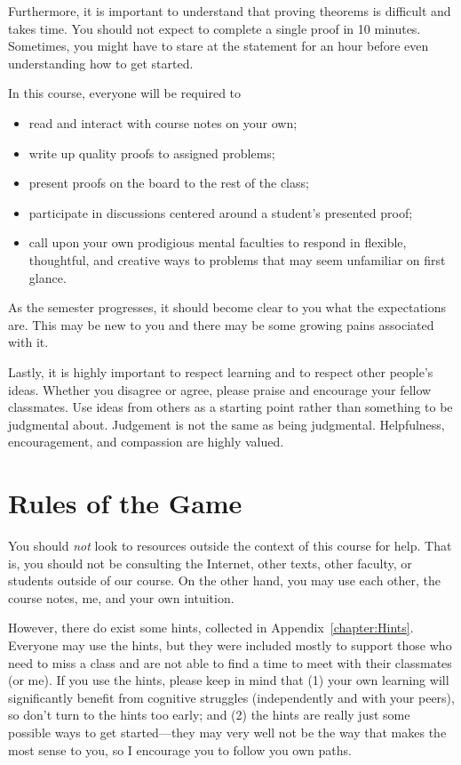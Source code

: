 Furthermore, it is important to understand that proving theorems is difficult and takes time. You should not expect to complete a single proof in 10 minutes. Sometimes, you might have to stare at the statement for an hour before even understanding how to get started. 

In this course, everyone will be required to
\begin{itemize}
\item read and interact with course notes on your own;
\item write up quality proofs to assigned problems;
\item present proofs on the board to the rest of the class;
\item participate in discussions centered around a student's presented proof;
\item call upon your own prodigious mental faculties to respond in flexible, thoughtful, and creative ways to problems that may seem unfamiliar on first glance.
\end{itemize}
\noindent As the semester progresses, it should become clear to you what the expectations are. This may be new to you and there may be some growing pains associated with it.

Lastly, it is highly important to respect learning and to respect other people's ideas.  Whether you disagree or agree, please praise and encourage your fellow classmates.  Use ideas from others as a starting point rather than something to be judgmental about.  Judgement is not the same as being judgmental.  Helpfulness, encouragement, and compassion are highly valued.

\section{Rules of the Game}
You should \emph{not} look to resources outside the context of this course for help. That is, you should not be consulting the Internet, other texts, other faculty, or students outside of our course. On the other hand, you may use each other, the course notes, me, and your own intuition.  

However, there do exist some hints, collected in Appendix~\ref{chapter:Hints}. Everyone may use the hints, but they were included mostly to support those who need to miss a class and are not able to find a time to meet with their classmates (or me). If you use the hints, please keep in mind that (1) your own learning will significantly benefit from cognitive struggles (independently and with your peers), so don't turn to the hints too early; and (2) the hints are really just some possible ways to get started---they may very well not be the way that makes the most sense to you, so I encourage you to follow you own paths. 

